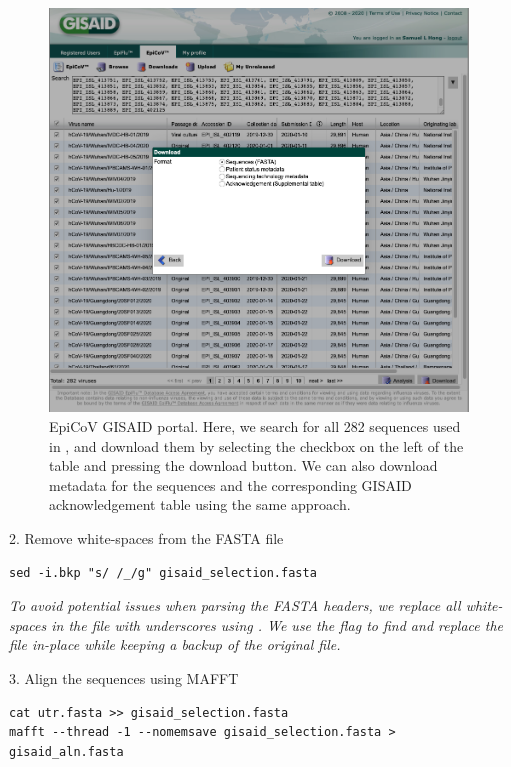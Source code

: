 \documentclass{article}
\newcommand{\ann}[1]{
\begin{adjustwidth}{0.5cm}{}
\it{#1}\\
\end{adjustwidth}}
\newcommand{\code}[1]{
{\upshape\ttfamily{#1}}}
\begin{document}
\begin{figure}[!ht]
    \centering
    \includegraphics[width=0.99\textwidth]{figs/gisaid_screenshot.png}
    \caption{EpiCoV GISAID portal. Here, we search for all 282 sequences used in \cite{travhist}, and download them by selecting the checkbox on the left of the table and pressing the download button. We can also download metadata for the sequences and the corresponding GISAID acknowledgement table using the same approach.}
    \label{fig:GISAID}
\end{figure}


2. Remove white-spaces from the FASTA file %
\begin{verbatim}
sed -i.bkp "s/ /_/g" gisaid_selection.fasta 
\end{verbatim}

\ann{To avoid potential issues when parsing the FASTA headers, we replace all white-spaces in the file with underscores using \code{sed}.  We use the \code{-i} flag to find and replace the file in-place while keeping a backup of the original file.}

3. Align the sequences using MAFFT
\begin{verbatim}
cat utr.fasta >> gisaid_selection.fasta
mafft --thread -1 --nomemsave gisaid_selection.fasta > gisaid_aln.fasta
\end{verbatim}
\end{document}
